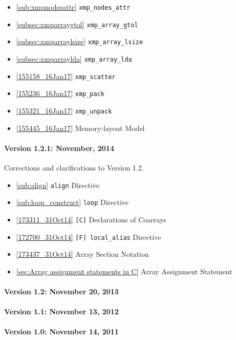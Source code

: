 \begin{itemize}
  \item \ref{sub:xmpnodesattr}         {\tt xmp\_nodes\_attr}
  \item \ref{subsec:xmparraygtol}      {\tt xmp\_array\_gtol}
  \item \ref{subsec:xmparraylsize}     {\tt xmp\_array\_lsize}
  \item \ref{subsec:xmparraylda}       {\tt xmp\_array\_lda}
  \item \ref{155158_16Jan17}           {\tt xmp\_scatter}
  \item \ref{155236_16Jan17}           {\tt xmp\_pack}
  \item \ref{155321_16Jan17}           {\tt xmp\_unpack}
  \item \ref{155445_16Jan17}           Memory-layout Model
\end{itemize}


\paragraph*{Version 1.2.1: November, 2014} Corrections and
clarifications to Version 1.2.

\begin{itemize}
  \item \ref{sub:align} {\tt align} Directive
  \item \ref{sub:loop_construct} {\tt loop} Directive
  \item \ref{173311_31Oct14} {\tt [C]} Declarations of Coarrays
  \item \ref{172700_31Oct14} {\tt [F] local\_alias} Directive
  \item \ref{173437_31Oct14} Array Section Notation
  \item \ref{sec:Array assignment statements in C} Array Assignment Statement
\end{itemize}

\paragraph*{Version 1.2: November 20, 2013}

\paragraph*{Version 1.1: November 13, 2012}

\paragraph*{Version 1.0: November 14, 2011}

